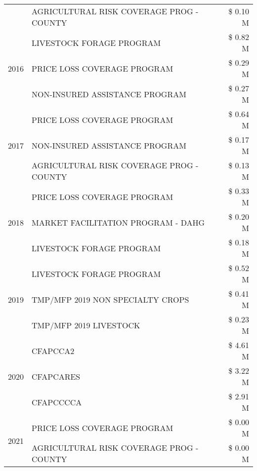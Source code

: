 \begin{tabular}{llr}
 & AGRICULTURAL RISK COVERAGE PROG - COUNTY & \$ 0.10 M \\
\cline{1-3}
\multirow[t]{3}{*}{2016} & LIVESTOCK FORAGE PROGRAM & \$ 0.82 M \\
 & PRICE LOSS COVERAGE PROGRAM & \$ 0.29 M \\
 & NON-INSURED ASSISTANCE PROGRAM & \$ 0.27 M \\
\cline{1-3}
\multirow[t]{3}{*}{2017} & PRICE LOSS COVERAGE PROGRAM & \$ 0.64 M \\
 & NON-INSURED ASSISTANCE PROGRAM & \$ 0.17 M \\
 & AGRICULTURAL RISK COVERAGE PROG - COUNTY & \$ 0.13 M \\
\cline{1-3}
\multirow[t]{3}{*}{2018} & PRICE LOSS COVERAGE PROGRAM & \$ 0.33 M \\
 & MARKET FACILITATION PROGRAM - DAHG & \$ 0.20 M \\
 & LIVESTOCK FORAGE PROGRAM & \$ 0.18 M \\
\cline{1-3}
\multirow[t]{3}{*}{2019} & LIVESTOCK FORAGE PROGRAM & \$ 0.52 M \\
 & TMP/MFP 2019 NON SPECIALTY CROPS & \$ 0.41 M \\
 & TMP/MFP 2019 LIVESTOCK & \$ 0.23 M \\
\cline{1-3}
\multirow[t]{3}{*}{2020} & CFAPCCA2 & \$ 4.61 M \\
 & CFAPCARES & \$ 3.22 M \\
 & CFAPCCCCA & \$ 2.91 M \\
\cline{1-3}
\multirow[t]{2}{*}{2021} & PRICE LOSS COVERAGE PROGRAM & \$ 0.00 M \\
 & AGRICULTURAL RISK COVERAGE PROG - COUNTY & \$ 0.00 M \\
\cline{1-3}
\bottomrule
\end{tabular}
